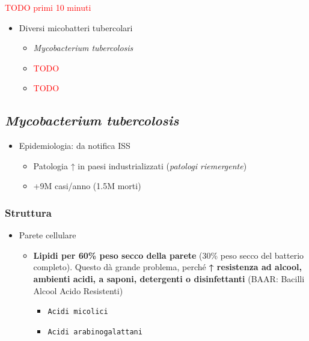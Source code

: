 \documentclass[italian,]{article}
\providecommand{\tightlist}{%
  \setlength{\itemsep}{0pt}\setlength{\parskip}{0pt}}
\newcommand{\TODO}[1]{\textcolor{red}{\textsf{\footnotesize{TODO #1}}}} %
\begin{document}
\TODO{primi 10 minuti}

\begin{itemize}
\tightlist
\item
  Diversi micobatteri tubercolari

  \begin{itemize}
  \item
    \emph{Mycobacterium tubercolosis}
  \item
    \TODO{}
  \item
    \TODO{}
  \end{itemize}
\end{itemize}

\hypertarget{mycobacterium-tubercolosis}{%
\subsection{\texorpdfstring{\emph{Mycobacterium
tubercolosis}}{Mycobacterium tubercolosis}}\label{mycobacterium-tubercolosis}}

\begin{itemize}
\tightlist
\item
  Epidemiologia: da notifica ISS

  \begin{itemize}
  \tightlist
  \item
    Patologia ↑ in paesi industrializzati (\emph{patologi riemergente})
  \item
    +9M casi/anno (1.5M morti)
  \end{itemize}
\end{itemize}

\hypertarget{struttura}{%
\subsubsection{Struttura}\label{struttura}}

\begin{itemize}
\tightlist
\item
  Parete cellulare

  \begin{itemize}
  \tightlist
  \item
    \textbf{Lipidi per 60\% peso secco della parete} (30\% peso secco
    del batterio completo). Questo dà grande problema, perché \textbf{↑
    resistenza ad alcool, ambienti acidi, a saponi, detergenti o
    disinfettanti} (BAAR: Bacilli Alcool Acido Resistenti)

    \begin{itemize}
    \tightlist
    \item
      \texttt{Acidi\ micolici}
    \item
      \texttt{Acidi\ arabinogalattani}
    \end{itemize}
  \end{itemize}
\end{itemize}
\end{document}
